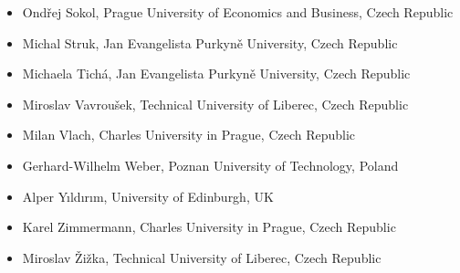 \begin{itemize}[nosep]
     \item Ondřej Sokol, Prague University of Economics and Business, Czech Republic
     \item Michal Struk, Jan Evangelista Purkyně University, Czech Republic
     \item Michaela Tichá, Jan Evangelista Purkyně University, Czech Republic
     \item Miroslav Vavroušek, Technical University of Liberec, Czech Republic
     \item Milan Vlach, Charles University in Prague, Czech Republic
     \item Gerhard-Wilhelm Weber, Poznan University of Technology, Poland
     \item Alper Yıldırım, University of Edinburgh, UK
     \item Karel Zimmermann, Charles University in Prague, Czech Republic
     \item Miroslav Žižka, Technical University of Liberec, Czech Republic
\end{itemize}